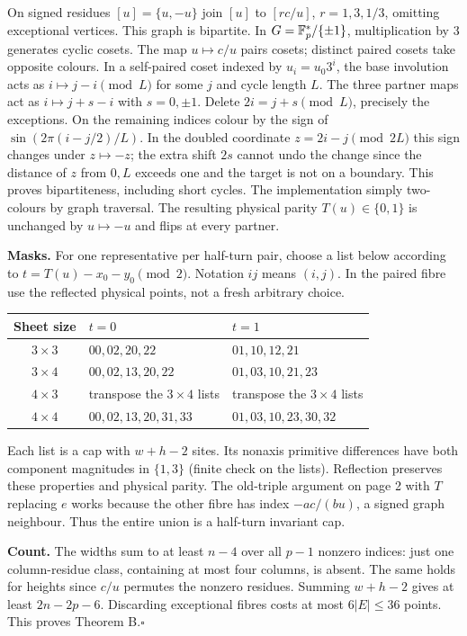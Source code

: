 \documentclass[10pt]{article}
\newcommand{\qed}{\hfill$\square$}
\begin{document}
On signed residues $[u]=\{u,-u\}$ join $[u]$ to $[rc/u]$, $r=1,3,1/3$, omitting exceptional vertices. This graph is bipartite. In $G=\mathbb F_p^*/\{\pm1\}$, multiplication by 3 generates cyclic cosets. The map $u\mapsto c/u$ pairs cosets; distinct paired cosets take opposite colours. In a self-paired coset indexed by $u_i=u_0 3^i$, the base involution acts as $i\mapsto j-i\pmod L$ for some $j$ and cycle length $L$. The three partner maps act as $i\mapsto j+s-i$ with $s=0,\pm1$. Delete $2i=j+s\pmod L$, precisely the exceptions. On the remaining indices colour by the sign of $\sin(2\pi(i-j/2)/L)$. In the doubled coordinate $z=2i-j\pmod{2L}$ this sign changes under $z\mapsto-z$; the extra shift $2s$ cannot undo the change since the distance of $z$ from $0,L$ exceeds one and the target is not on a boundary. This proves bipartiteness, including short cycles. The implementation simply two-colours by graph traversal. The resulting physical parity $T(u)\in\{0,1\}$ is unchanged by $u\mapsto-u$ and flips at every partner.

\textbf{Masks.} For one representative per half-turn pair, choose a list below according to $t=T(u)-x_0-y_0\pmod2$. Notation $ij$ means $(i,j)$. In the paired fibre use the reflected physical points, not a fresh arbitrary choice.
\begin{center}\begin{tabular}{cll}\toprule
Sheet size & $t=0$ & $t=1$\\\midrule
$3\times3$ & $00,02,20,22$ & $01,10,12,21$\\
$3\times4$ & $00,02,13,20,22$ & $01,03,10,21,23$\\
$4\times3$ & transpose the $3\times4$ lists & transpose the $3\times4$ lists\\
$4\times4$ & $00,02,13,20,31,33$ & $01,03,10,23,30,32$\\\bottomrule\end{tabular}\end{center}
Each list is a cap with $w+h-2$ sites. Its nonaxis primitive differences have both component magnitudes in $\{1,3\}$ (finite check on the lists). Reflection preserves these properties and physical parity. The old-triple argument on page 2 with $T$ replacing $e$ works because the other fibre has index $-ac/(bu)$, a signed graph neighbour. Thus the entire union is a half-turn invariant cap.

\textbf{Count.} The widths sum to at least $n-4$ over all $p-1$ nonzero indices: just one column-residue class, containing at most four columns, is absent. The same holds for heights since $c/u$ permutes the nonzero residues. Summing $w+h-2$ gives at least $2n-2p-6$. Discarding exceptional fibres costs at most $6|E|\le36$ points. This proves Theorem B.\qed
\end{document}
